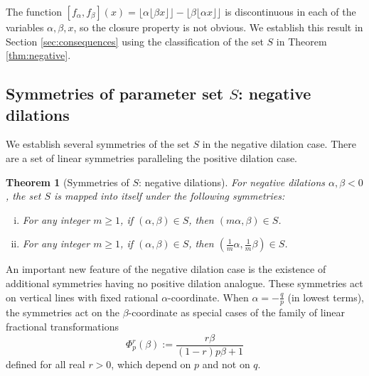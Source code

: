 \documentclass[11pt, letterpaper, reqno]{amsart}
\newtheorem{thm}{Theorem}[section]
\theoremstyle{definition}
\theoremstyle{remark}
\numberwithin{equation}{section}
\newcommand{\floor}[1]{\lfloor{#1}\rfloor}
\begin{document}
\noindent 
The function 
$[f_\alpha, f_\beta](x) = \floor{\alpha\floor{\beta x}} - \floor{\beta\floor{\alpha x}}$ 
is  discontinuous in each of the variables $\alpha, \beta, x$,
so the closure property is not obvious.
We establish this result in Section \ref{sec:consequences} 
using the  classification of the  set $S$  in Theorem \ref{thm:negative}.

%
%

\subsection{Symmetries of parameter set  $S$: negative dilations} 
\label{subsec:symm-neg}
We establish several symmetries of the set $S$ in the negative  dilation case.
There are a set of linear symmetries paralleling the positive dilation case. 

%
%  
%
\begin{thm}[Symmetries of $S$: negative dilations]
\label{thm:symmetries-n}
For negative dilations $\alpha, \beta < 0$, 
the  set $S$ is mapped into itself 
under the following symmetries:
\begin{enumerate}[(i)]
\item For any integer $m \ge 1$, if $(\alpha, \beta) \in S$, then $(m\alpha, \beta) \in S$.
\item For any integer $m \ge 1$, if $(\alpha, \beta) \in S$, then 
$(\frac{1}{m}\alpha, \frac{1}{m}\beta) \in S$.
\end{enumerate}
\end{thm}



An important new feature of the  negative dilation case is the existence of
additional symmetries having no positive dilation analogue. 
These symmetries act on vertical lines 
with fixed rational  $\alpha$-coordinate.
When $\alpha= -\frac{q}{p}$ (in lowest terms),  
the symmetries act on the $\beta$-coordinate  as special cases of 
the family of linear fractional transformations
 \begin{equation*}
\Phi_{p}^r(\beta) := \frac{r \beta}{ (1-r)p \beta +1}  
\end{equation*}
defined for all real $r>0$, which depend on $p$ and not on  $q$.
\end{document}
